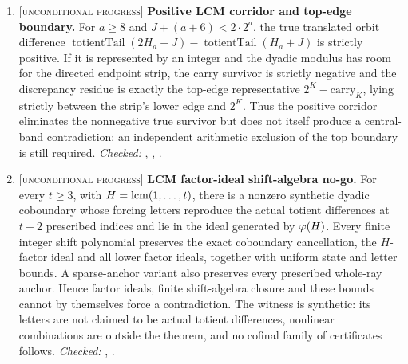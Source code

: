 \documentclass[11pt]{article}
\newcommand{\stag}[1]{{\normalfont\footnotesize\textsc{[#1]}}}
\begin{document}
{\begin{enumerate}[label=\textbf{R\arabic*.},ref=R\arabic*,leftmargin=2.4em,
  itemsep=0.2em,topsep=0.25em]
\item\label{res:actualsign} \stag{unconditional progress}
\textbf{Positive LCM corridor and top-edge boundary.}  For $a\ge8$ and
$J+(a+6)<2\cdot2^a$, the true translated orbit difference
$\operatorname{totientTail}(2H_a+J)-\operatorname{totientTail}(H_a+J)$ is
strictly positive.  If it is represented by an integer and the dyadic
modulus has room for the directed endpoint strip, the carry survivor is
strictly negative and the discrepancy residue is exactly the top-edge
representative $2^K-\text{carry}_K$, lying strictly between the strip's lower
edge and $2^K$.  Thus the positive corridor eliminates the nonnegative true
survivor but does not itself produce a central-band contradiction; an
independent arithmetic exclusion of the top boundary is still required.
{\footnotesize\emph{Checked:}
,
,
.}

\item\label{res:factorideal} \stag{unconditional progress}
\textbf{LCM factor-ideal shift-algebra no-go.}  For every $t\ge3$, with
$H=\operatorname{lcm}(1,\ldots,t)$, there is a nonzero synthetic dyadic coboundary whose
forcing letters reproduce the actual totient differences at $t-2$ prescribed
indices and lie in the ideal generated by $\varphi(H)$.  Every finite integer
shift polynomial preserves the exact coboundary cancellation, the $H$-factor
ideal and all lower factor ideals, together with uniform state and letter
bounds.  A sparse-anchor variant also preserves every prescribed whole-ray
anchor.  Hence factor ideals, finite shift-algebra closure and these bounds
cannot by themselves force a contradiction.  The witness is synthetic: its
letters are not claimed to be actual totient differences, nonlinear
combinations are outside the theorem, and no cofinal family of certificates
follows.
{\footnotesize\emph{Checked:}
,
.}


\end{enumerate}}
\end{document}
